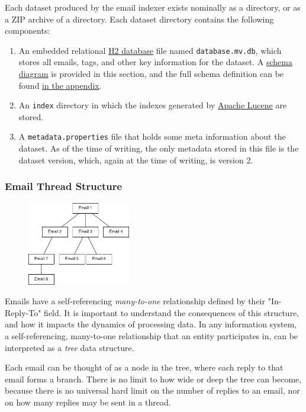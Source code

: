\documentclass[a4paper, 12pt]{article}
\begin{document}
		Each dataset produced by the email indexer exists nominally as a directory, or as a ZIP archive of a directory. Each dataset directory contains the following components:
		
		\begin{enumerate}
			\item An embedded relational \href{https://www.h2database.com}{H2 database} file named \texttt{database.mv.db}, which stores all emails, tags, and other key information for the dataset. A \hyperref[fig:schema]{schema diagram} is provided in this section, and the full schema definition can be found \hyperref[sec:dataset-schema]{in the appendix}.
			\item An \texttt{index} directory in which the indexes generated by \href{https://lucene.apache.org/}{Apache Lucene} are stored.
			\item A \texttt{metadata.properties} file that holds some meta information about the dataset. As of the time of writing, the only metadata stored in this file is the dataset version, which, again at the time of writing, is version 2.
		\end{enumerate}
	
		\subsubsection{Email Thread Structure}
			\begin{figure}
				\label{fig:email-threads}
				\includegraphics[width=0.4\textwidth]{img/email-threads.png}
			\end{figure}
			
			Emails have a self-referencing \textit{many-to-one} relationship defined by their "In-Reply-To" field. It is important to understand the consequences of this structure, and how it impacts the dynamics of processing data. In any information system, a self-referencing, many-to-one relationship that an entity participates in, can be interpreted as a \textit{tree} data structure.
			
			Each email can be thought of as a node in the tree, where each reply to that email forms a branch. There is no limit to how wide or deep the tree can become, because there is no universal hard limit on the number of replies to an email, nor on how many replies may be sent in a thread.
			
\end{document}
